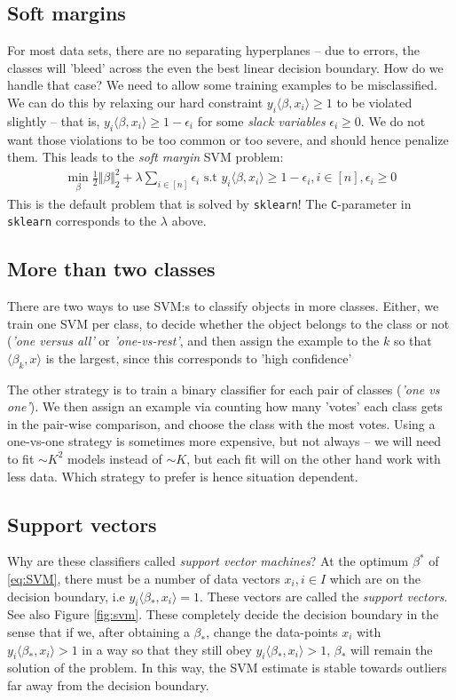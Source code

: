 \documentclass{article}
\newcommand{\sprod}[1]{\langle #1 \rangle}
\newcommand{\norm}[1]{\Vert #1 \Vert}
\begin{document}
\subsection{Soft margins} For most data sets, there are no separating hyperplanes -- due to errors, the classes will 'bleed' across the even the best linear decision boundary. How do we handle that case? We need to allow some training examples to be misclassified. We can do this by relaxing our hard constraint $y_i \sprod{\beta,x_i}\geq 1$ to be violated slightly -- that is, $y_i\sprod{\beta,x_i}\geq 1 -\epsilon_i$ for some \emph{slack variables} $\epsilon_i\geq 0$. We do not want those violations to be too common or too severe, and should hence penalize them. This leads to the \emph{soft margin} SVM problem:
\begin{align}
    \min_\beta \tfrac{1}{2}\norm{\beta}_2^2 + \lambda \sum_{i\in [n]} \epsilon_i \text{ s.t } y_i\sprod{\beta,x_i}\geq 1-\epsilon_i, i \in [n] , \epsilon_i \geq 0\label{eq:SVMsoft}
\end{align}
This is the default problem that is solved by \texttt{sklearn}! The \texttt{C}-parameter in \texttt{sklearn} corresponds to the $\lambda$ above. 

\subsection{More than two classes} There are two ways to use SVM:s to classify objects in more classes. Either, we train one SVM per class, to decide whether the object belongs to the class or not (\emph{'one versus all'} or \emph{'one-vs-rest'}, and then assign the example to the $k$ so that $\sprod{\beta_k,x}$ is the largest, since this corresponds to 'high confidence' 

The other strategy is to train a binary classifier for each pair of classes (\emph{'one vs one'}). We then assign an example via counting how many 'votes' each class gets in the pair-wise comparison, and choose the class with the most votes. Using a one-vs-one strategy is sometimes more expensive, but not always -- we will need to fit $\sim K^2$ models instead of $\sim K$, but each fit will on the other hand work with less data. Which strategy to prefer is hence situation dependent.

\subsection{Support vectors}
Why are these classifiers called \emph{support vector machines}? At the optimum $\beta^*$ of \eqref{eq:SVM}, there must be a number of data vectors $x_i, i\in I$ which are on the decision boundary, i.e  $y_i\sprod{\beta_*,x_i}=1$. These vectors are called the \emph{support vectors}. See also Figure \ref{fig:svm}. These completely decide the decision boundary in the sense that if we, after obtaining a $\beta_*$, change the data-points $x_i$ with $y_i \sprod{\beta_*,x_i}>1$ in a way so that they still obey $y_i \sprod{\beta_*,x_i}>1$, $\beta_*$ will remain the solution of the problem. In this way, the SVM estimate is stable towards outliers far away from the decision boundary.
\end{document}
